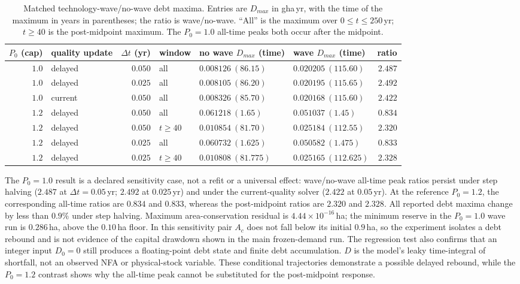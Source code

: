 \documentclass[11pt,a4paper]{article}
\begin{document}
\begin{table}[htbp]
\centering\small
\caption{Matched technology-wave/no-wave debt maxima. Entries are $D_{max}$ in gha\,yr, with the time of the maximum in years in parentheses; the ratio is wave/no-wave. ``All'' is the maximum over $0\le t\le250$\,yr; $t\ge40$ is the post-midpoint maximum. The $P_0=1.0$ all-time peaks both occur after the midpoint.}
\label{tab:si_wave_debt}
\begin{tabularx}{\textwidth}{r l r l >{\centering\arraybackslash}X >{\centering\arraybackslash}X r}
\toprule
$P_0$ (cap) & quality update & $\Delta t$ (yr) & window & no wave $D_{max}$ (time) & wave $D_{max}$ (time) & ratio \\
\midrule
$1.0$ & delayed & $0.050$ & all & $0.008126\ (86.15)$ & $0.020205\ (115.60)$ & $2.487$ \\
$1.0$ & delayed & $0.025$ & all & $0.008105\ (86.20)$ & $0.020195\ (115.65)$ & $2.492$ \\
$1.0$ & current & $0.050$ & all & $0.008326\ (85.70)$ & $0.020168\ (115.60)$ & $2.422$ \\
$1.2$ & delayed & $0.050$ & all & $0.061218\ (1.65)$ & $0.051037\ (1.45)$ & $0.834$ \\
$1.2$ & delayed & $0.050$ & $t\ge40$ & $0.010854\ (81.70)$ & $0.025184\ (112.55)$ & $2.320$ \\
$1.2$ & delayed & $0.025$ & all & $0.060732\ (1.625)$ & $0.050582\ (1.475)$ & $0.833$ \\
$1.2$ & delayed & $0.025$ & $t\ge40$ & $0.010808\ (81.775)$ & $0.025165\ (112.625)$ & $2.328$ \\
\bottomrule
\end{tabularx}
\end{table}

The $P_0=1.0$ result is a declared sensitivity case, not a refit or a universal effect: wave/no-wave all-time peak ratios persist under step halving ($2.487$ at $\Delta t=0.05$\,yr; $2.492$ at $0.025$\,yr) and under the current-quality solver ($2.422$ at $0.05$\,yr). At the reference $P_0=1.2$, the corresponding all-time ratios are $0.834$ and $0.833$, whereas the post-midpoint ratios are $2.320$ and $2.328$. All reported debt maxima change by less than $0.9\%$ under step halving. Maximum area-conservation residual is $4.44\times10^{-16}$\,ha; the minimum reserve in the $P_0=1.0$ wave run is $0.286$\,ha, above the $0.10$\,ha floor. In this sensitivity pair $A_c$ does not fall below its initial $0.9$\,ha, so the experiment isolates a debt rebound and is not evidence of the capital drawdown shown in the main frozen-demand run. The regression test also confirms that an integer input $D_0=0$ still produces a floating-point debt state and finite debt accumulation. $D$ is the model's leaky time-integral of shortfall, not an observed NFA or physical-stock variable. These conditional trajectories demonstrate a possible delayed rebound, while the $P_0=1.2$ contrast shows why the all-time peak cannot be substituted for the post-midpoint response.
\end{document}

